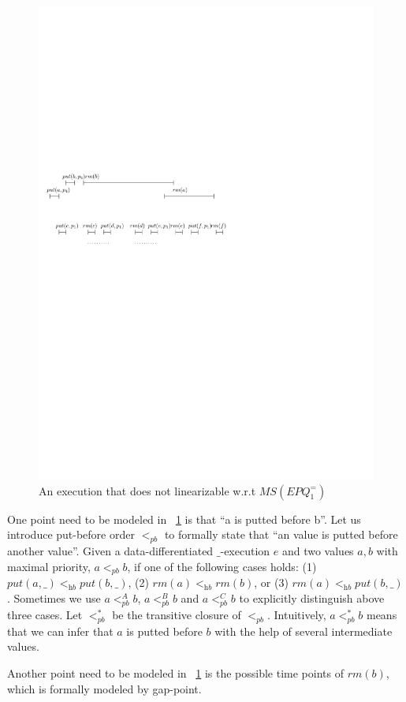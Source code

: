 \begin{figure}[htbp]
  \centering
  \includegraphics[width=0.6 \textwidth]{figures/PIC-HIS-INTRO-PB-ORDER-EPQ.pdf}
  \caption{An execution that does not linearizable w.r.t $\textit{MS}(\textit{EPQ}_1^{=})$}
  \label{fig:introduce pb order}
\end{figure}

One point need to be modeled in \figurename~\ref{fig:introduce pb order} is that ``a is putted before b''. Let us introduce put-before order $<_{\textit{pb}}$ to formally state that ``an value is putted before another value''. Given a data-differentiated $\_$-execution $e$ and two values $a,b$ with maximal priority, $a <_{\textit{pb}} b$, if one of the following cases holds: (1) $\textit{put}(a,\_) <_{\textit{hb}} \textit{put}(b,\_)$, (2) $\textit{rm}(a) <_{\textit{hb}} \textit{rm}(b)$, or (3) $\textit{rm}(a) <_{\textit{hb}} \textit{put}(b,\_)$. Sometimes we use $a <_{\textit{pb}}^A b$, $a <_{\textit{pb}}^B b$ and $a <_{\textit{pb}}^C b$ to explicitly distinguish above three cases. Let $<_{\textit{pb}}^*$ be the transitive closure of $<_{\textit{pb}}$. Intuitively, $a <_{\textit{pb}}^* b$ means that we can infer that $a$ is putted before $b$ with the help of several intermediate values.

Another point need to be modeled in \figurename~\ref{fig:introduce pb order} is the possible time points of $\textit{rm}(b)$, which is formally modeled by gap-point.

